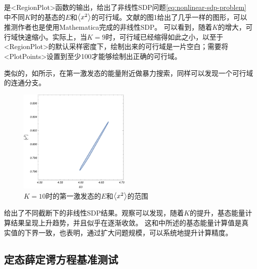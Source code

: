 \documentclass[oneside]{fduthesis}
\def\texttt#1{<#1>}%
\begin{document}
是\texttt{RegionPlot}函数的输出，给出了非线性SDP问题\eqref{eq:nonlinear-sdp-problem}中不同$K$时的基态的$E$和$\expval{x^2}$的可行域。文献\parencite{han_matrix}的图1给出了几乎一样的图形，可以推测作者也是使用Mathematica完成的非线性SDP。
可以看到，随着$K$的增大，可行域快速缩小。实际上，当$K=9$时，可行域已经缩得如此之小，以至于\texttt{RegionPlot}的默认采样密度下，绘制出来的可行域是一片空白；需要将\texttt{PlotPoints}设置到至少100才能够绘制出正确的可行域。

类似的，如所示，在第一激发态的能量附近做暴力搜索，同样可以发现一个可行域的连通分支。

\begin{figure}
    \centering
    \includegraphics[width=0.48\textwidth]{nonlinear-oscillator-nonlinear-sdp-k-10-first-excited-region.pdf}
    \caption{$K=10$时的第一激发态的$E$和$\expval{x^2}$的范围}
    \label{fig:first-excited-nonlinear-oscillator}
\end{figure}



给出了不同截断下的非线性SDP结果。观察可以发现，随着$K$的提升，基态能量计算结果呈现上升趋势，并且似乎在逐渐收敛。
这和中所述的基态能量计算值是真实值的下界一致，也表明，通过扩大问题规模，可以系统地提升计算精度。

\subsection{定态薛定谔方程基准测试}


\end{document}
